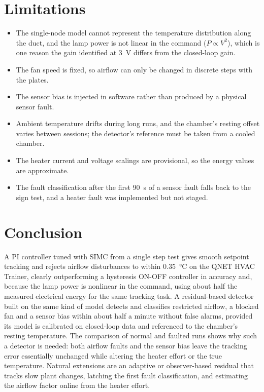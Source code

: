 \documentclass[conference,a4paper]{IEEEtran}
\begin{document}
\section{Limitations}
\begin{itemize}
\item The single-node model cannot represent the temperature distribution along the duct, and the
lamp power is not linear in the command ($P\propto V^2$), which is one reason the gain identified at
\SI{3}{V} differs from the closed-loop gain.
\item The fan speed is fixed, so airflow can only be changed in discrete steps with the plates.
\item The sensor bias is injected in software rather than produced by a physical sensor fault.
\item Ambient temperature drifts during long runs, and the chamber's resting offset varies between
sessions; the detector's reference must be taken from a cooled chamber.
\item The heater current and voltage scalings are provisional, so the energy values are approximate.
\item The fault classification after the first \SI{90}{s} of a sensor fault falls back to the sign
test, and a heater fault was implemented but not staged.
\end{itemize}

\section{Conclusion}
A PI controller tuned with SIMC from a single step test gives smooth setpoint tracking and rejects
airflow disturbances to within \SI{0.35}{\celsius} on the QNET HVAC Trainer, clearly outperforming
a hysteresis ON-OFF controller in accuracy and, because the lamp power is nonlinear in the command,
using about half the measured electrical energy for the same tracking task. A residual-based detector built on the same kind of model
detects and classifies restricted airflow, a blocked fan and a sensor bias within about half a
minute without false alarms, provided its model is calibrated on closed-loop data and referenced to
the chamber's resting temperature. The comparison of normal and faulted runs shows why such a
detector is needed: both airflow faults and the sensor bias leave the tracking error essentially
unchanged while altering the heater effort or the true temperature. Natural extensions are an
adaptive or observer-based residual that tracks slow plant changes, latching the first fault
classification, and estimating the airflow factor online from the heater effort.
\end{document}
